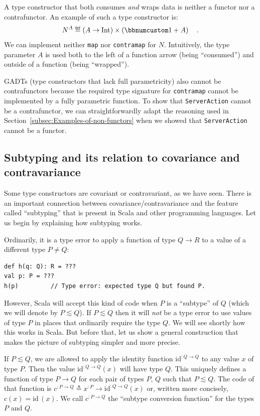 A type constructor that both consumes \emph{and} wraps data is neither
a functor nor a contrafunctor. An example of such a type constructor
is:
\[
N^{A}\triangleq\left(A\rightarrow\text{Int}\right)\times\left(\bbnum 1+A\right)\quad.
\]
We can implement neither \lstinline!map! nor \lstinline!contramap!
for $N$. Intuitively, the type parameter $A$ is used both to the
left of a function arrow (being \textsf{``}consumed\textsf{''}) and outside of a function
(being \textsf{``}wrapped\textsf{''}).

GADTs (type constructors that lack full parametricity)
also cannot be contrafunctors because the required type signature
for \lstinline!contramap! cannot be implemented by a fully parametric
function. To show that \lstinline!ServerAction! cannot be a contrafunctor,
we can straightforwardly adapt the reasoning used in Section~\ref{subsec:Examples-of-non-functors}
when we showed that \lstinline!ServerAction! cannot be a functor.

\subsection{Subtyping and its relation to covariance and contravariance\label{subsec:Covariance,-contravariance,-and-subtyping}}

Some type constructors are covariant or contravariant, as we have
seen. There is an important connection between covariance/contravariance
and the feature called \textsf{``}subtyping\textsf{''} that is present in Scala and
other programming languages. Let us begin by explaining how subtyping
works.

Ordinarily, it is a type error to apply a function of type $Q\rightarrow R$
to a value of a different type $P\neq\ensuremath{Q}$:
\begin{lstlisting}
def h(q: Q): R = ???
val p: P = ???
h(p)         // Type error: expected type Q but found P.
\end{lstlisting}
However, Scala will accept this kind of code when $P$ is a \textsf{``}subtype\textsf{''}
of $Q$ (which we will denote by $P\lesssim Q$). If $P\lesssim Q$
then it will \emph{not} be a type error to use values of type $P$
in places that ordinarily require the type $Q$. We will see shortly
how this works in Scala. But before that, let us show a general construction
that makes the picture of subtyping simpler and more precise.

If $P\lesssim Q$, we are allowed to apply the identity function $\text{id}^{:Q\rightarrow Q}$
to any value $x$ of type $P$. Then the value $\text{id}^{:Q\rightarrow Q}(x)$
will have type $Q$. This uniquely defines a function of type $P\rightarrow Q$
for each pair of types $P$, $Q$ such that $P\lesssim Q$. The code
of that function is $c^{:P\rightarrow Q}\triangleq x^{:P}\rightarrow\text{id}^{:Q\rightarrow Q}(x)$
or, written more concisely, $c(x)=\text{id}\,(x)$. We call $c^{:P\rightarrow Q}$
the \textsf{``}subtype conversion function\textsf{''} for the types $P$ and $Q$.

